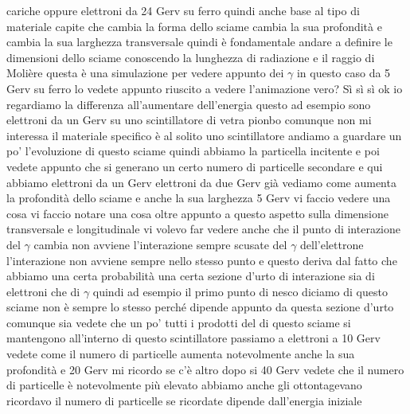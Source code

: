 {cariche oppure elettroni da 24 Gerv su ferro quindi anche base al tipo di materiale capite che cambia la forma dello sciame cambia la sua profondità e cambia la sua larghezza transversale quindi è fondamentale andare a definire le dimensioni dello sciame conoscendo la lunghezza di radiazione e il raggio di Molière questa è una simulazione per vedere appunto dei $\gamma$ in questo caso da 5 Gerv su ferro lo vedete appunto riuscito a vedere l'animazione vero? Sì sì sì ok io regardiamo la differenza all'aumentare dell'energia questo ad esempio sono elettroni da un Gerv su uno scintillatore di vetra pionbo comunque non mi interessa il materiale specifico è al solito uno scintillatore andiamo a guardare un po' l'evoluzione di questo sciame quindi abbiamo la particella incitente e poi vedete appunto che si generano un certo numero di particelle secondare e qui abbiamo elettroni da un Gerv elettroni da due Gerv già vediamo come aumenta la profondità dello sciame e anche la sua larghezza 5 Gerv vi faccio vedere una cosa vi faccio notare una cosa oltre appunto a questo aspetto sulla dimensione transversale e longitudinale vi volevo far vedere anche che il punto di interazione del $\gamma$ cambia non avviene l'interazione sempre scusate del $\gamma$ dell'elettrone l'interazione non avviene sempre nello stesso punto e questo deriva dal fatto che abbiamo una certa probabilità una certa sezione d'urto di interazione sia di elettroni che di $\gamma$ quindi ad esempio il primo punto di nesco diciamo di questo sciame non è sempre lo stesso perché dipende appunto da questa sezione d'urto comunque sia vedete che un po' tutti i prodotti del di questo sciame si mantengono all'interno di questo scintillatore passiamo a elettroni a 10 Gerv vedete come il numero di particelle aumenta notevolmente anche la sua profondità e 20 Gerv mi ricordo se c'è altro dopo si 40 Gerv vedete che il numero di particelle è notevolmente più elevato abbiamo anche gli ottontagevano ricordavo il numero di particelle se ricordate dipende dall'energia iniziale
}